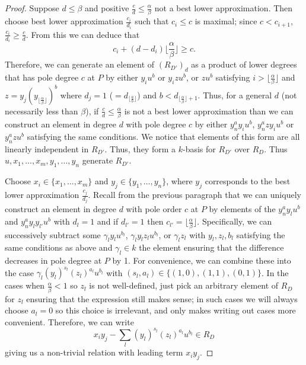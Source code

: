 \documentclass{amsart}
\theoremstyle{plain}
\theoremstyle{definition}
\theoremstyle{remark}
\numberwithin{equation}{section}
\begin{document}
\begin{proof}
Suppose $d\le \beta$ and positive $\frac{c}{d} \le \frac{\alpha}{
\beta}$ not a best lower approximation.  Then choose
best lower approximation $\frac{c_i}{d_i}$ such that $c_i\le c$ is
maximal; since $c<c_{i+1}$, $\frac{c_i}{d_i}\ge \frac{c}{d}$.  From
this we can deduce that 
\[
	c_i+(d-d_i) \lfloor \frac{\alpha}{\beta} \rfloor \ge c.
\]  
Therefore, we can generate an element of $(R_{D'})_d$ as a product of lower degrees that 
has pole degree $c$ at $P$ by either $y_i u^b$ or $y_i z u^b$, or $zu^b$ satisfying $i>
\lfloor \frac{\alpha}{\beta} \rfloor$ and $z=y_j (y_{\lfloor \frac{\alpha}{\beta} \rfloor})^b$ 
where $d_j=1$ ($=d_{{\lfloor \frac{a}{b} \rfloor}}$) and $b<d_{\lfloor \frac{\alpha}{\beta} 
\rfloor + 1}$.  
Thus, for a general $d$ (not necessarily less than $\beta$), if $\frac{c}{d} \le
\frac{\alpha}{\beta}$ is not a best lower approximation than we can
construct an element in degree $d$ with pole degree $c$ by either $y
_n^a y_i u^b$, $y_n^a zy_iu^b$ or $y_n^a z u^b$ satisfying the
same conditions.  We notice that elements of this form are all
linearly independent in $R_{D'}$.  Thus, they form a $k$-basis for
$R_{D'}$ over $R_D$.  Thus $u, x_1, ..., x_m, y_1, ..., y_n$ generate
$R_{D'}$.

Choose $x_i\in \{x_1, \ldots, x_m\}$ and $y_j\in \{y_1, \ldots, y_n\}$, where $y_j$ 
corresponds to the best lower approximation $\frac{c_j}{d_j}$.  Recall from the previous 
paragraph that we can uniquely construct an element in degree $d$ with pole order $c$ at 
$P$ by elements of the $y_n^a y_l u^b$ and $y_n^a y_l y_{l'} u^b$ with $d_l=1$ and if 
$d_{l'}=1$ then $c_{l'} = \lfloor \frac{\alpha}{\beta} \rfloor$.  Specifically, we can 
successively subtract some $\gamma_l y_l u^{b_l}$, $\gamma_l y_l z_l u^{b_l}$, or $
\gamma_l z_l$ with $y_l, z_l, b_l$ satisfying the same conditions as above and $\gamma_l
\in k$ the element ensuring that the difference decreases in pole degree at $P$ by 1.  For 
convenience, we can combine these into the case $\gamma_l (y_l)^{s_l}(z_l)^{a_l}u^{b_l}$ 
with $(s_l,a_l)\in \{(1,0),(1,1),(0,1)\}$.  In the cases when $\frac{\alpha}{\beta}<1$ so $z_l$ 
is not well-defined, just pick an arbitrary element of $R_D$ for $z_l$ ensuring that the 
expression still makes sense; in such cases we will always choose $a_l=0$ so this choice 
is irrelevant, and only makes writing out cases more convenient.  Therefore, we can write
\[
	x_i y_j - \sum_{l} (y_l)^{s_l} (z_l)^{a_l} u^{b_l}\in R_D
\]
giving us a non-trivial relation with leading term $x_iy_j$. 


\end{proof}
\end{document}
